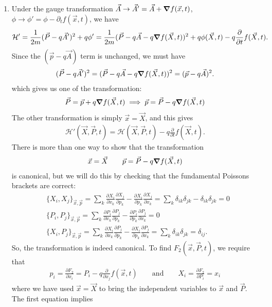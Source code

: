 \documentclass{article}
\theoremstyle{definition}
\newcommand{\p}{\partial}
\newcommand{\ham}{\mathcal{H}}
\newcommand{\f}[2]{\frac{#1}{#2}}
\begin{document}
\begin{enumerate}[label=(\alph*)]
	
	\item Under the gauge transformation $\vec{A}\to \vec{A}' = \vec{A} + \grad f (\vec{x},t)$, $\phi \to \phi' = \phi - \p_t f(\vec{x},t)$, we have
	\begin{align*}
	\ham' = \f{1}{2m} (\vec{P} - q\vec{A}')^2 + q\phi' = \f{1}{2m} (\vec{P} - q\vec{A} - q\grad f(\vec{X},t))^2 + q\phi(\vec{X},t) - q\f{\p}{\p t} f(\vec{X},t).
	\end{align*}
	Since the $(\vec{p} - q\vec{A})$ term is unchanged, we must have
	\begin{align*}
	 (\vec{P} - q\vec{A}')^2 = (\vec{P} - q\vec{A} - q\grad f(\vec{X},t))^2 = (\vec{p}-q\vec{A})^2.
	\end{align*}
	which gives us one of the transformation: 
	\begin{align*}
	\vec{P} = \vec{p} + q\grad f(\vec{X},t) \implies {\vec{p} = \vec{P} - q\grad f(\vec{X},t)}
	\end{align*}
	The other transformation is simply $\vec{x} = \vec{X}$, and this gives
	\begin{align*}
	\ham'(\vec{X},\vec{P},t) = \ham(\vec{X}, \vec{P},t) -q\f{\p }{\p t} f(\vec{X},t). 
	\end{align*}  
	There is more than one way to show that the transformation 
	\begin{align*}
	\vec{x} = \vec{X} \quad\quad \vec{p} = \vec{P} - q\grad f(\vec{X},t)
	\end{align*}
	is canonical, but we will do this by checking that the fundamental Poissons brackets are correct:
	\begin{align*}
	&\{ X_i, X_j \}_{\vec{x},\vec{p}} = \sum_k \f{\p X_i}{\p x_k} \f{\p X_j}{\p p_k} - \f{\p X_i}{\p p_k} \f{\p X_j}{\p x_k} = \sum_k \delta_{ik}\delta_{jk} - \delta_{ik}\delta_{jk} = 0\\
	&\{ P_i, P_j \}_{\vec{x},\vec{p}} = \sum_k \f{\p P_i}{\p x_k} \f{\p P_j}{\p p_k} - \f{\p P_i}{\p p_k} \f{\p P_j}{\p x_k} = 0\\
	&\{ X_i, P_j \}_{\vec{x},\vec{p}} = \sum_k \f{\p X_i}{\p x_k} \f{\p P_j}{\p p_k} - \f{\p X_i}{\p p_k} \f{\p P_j}{\p x_k} = \sum_k \delta_{ik}\delta_{jk}  =  \delta_{ij}.
	\end{align*}
	So, the transformation is indeed canonical. To find $F_2(\vec{x}, \vec{P},t)$, we require that 
	\begin{align*}
	p_i = \f{\p F_2}{\p x_i} = P_i - q\f{\p}{\p x_j} f(\vec{x},t) \quad\quad \text{and}\quad\quad  X_i = \f{\p F_2}{\p P_i} = x_i
	\end{align*}
	where we have used $\vec{x} = \vec{X}$ to bring the independent variables to $\vec{x}$ and $\vec{P}$. The first equation implies  

\end{enumerate}
\end{document}
